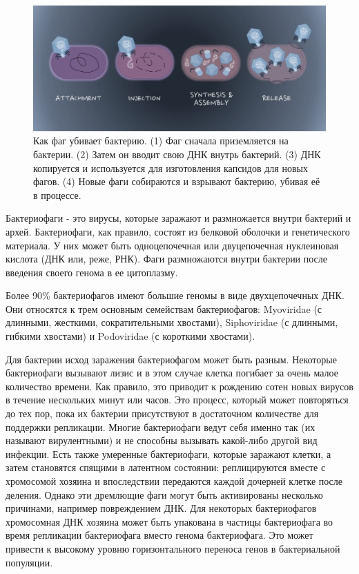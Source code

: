 \documentclass[14pt]{extarticle}
\begin{document}
    \begin{figure}[h]
        \centering
            \includegraphics[width=\textwidth]{img/average_phage.jpg}
        \caption{Как фаг убивает бактерию. (1) Фаг сначала приземляется на бактерии. (2) Затем он вводит свою ДНК внутрь
        бактерий. (3) ДНК копируется и используется для изготовления капсидов для новых фагов. (4) Новые фаги собираются
        и взрывают бактерию, убивая её в процессе. \cite{advdisphage}}
        \label{fig:skybox}
    \end{figure}
    
	\par{Бактериофаги - это вирусы, которые заражают и размножается внутри бактерий и архей. Бактериофаги, как правило, состоят из белковой оболочки и генетического материала. У них может быть одноцепочечная или двуцепочечная нуклеиновая кислота (ДНК или, реже, РНК). Фаги размножаются внутри бактерии после введения своего генома в ее цитоплазму. 
	\cite{phagewikieng}}
	
	\par{Более 90\% бактериофагов имеют большие геномы в виде двухцепочечных ДНК. Они относятся к трем основным 
	семействам бактериофагов: Myoviridae (с длинными, жесткими, сократительными хвостами), Siphoviridae
	(с длинными, гибкими хвостами) и Podoviridae (с короткими хвостами). 
	\cite{phageapps}}
	
	\par{Для бактерии исход заражения бактериофагом может быть разным. Некоторые бактериофаги вызывают лизис и в этом 
	случае клетка погибает за очень малое количество времени. Как правило, это приводит к рождению сотен новых вирусов в
	течение нескольких минут или часов. Это процесс, который может повторяться до тех пор, пока их бактерии 
	присутствуют в достаточном количестве для поддержки репликации. Многие бактериофаги ведут себя именно так (их
	называют вирулентными) и не способны вызывать какой-либо другой вид инфекции. Есть также умеренные 
	бактериофаги, которые заражают клетки, а затем становятся спящими в латентном состоянии: реплицируются вместе с 
	хромосомой хозяина и впоследствии передаются каждой дочерней клетке после деления. Однако эти дремлющие фаги могут 
	быть активированы несколько причинами, например повреждением ДНК. Для некоторых бактериофагов хромосомная ДНК 
	хозяина может быть упакована в частицы бактериофага во время репликации бактериофага вместо генома бактериофага. Это
	может привести к высокому уровню горизонтального переноса генов в бактериальной популяции.  \cite{phagetreat}}
    
\end{document}
